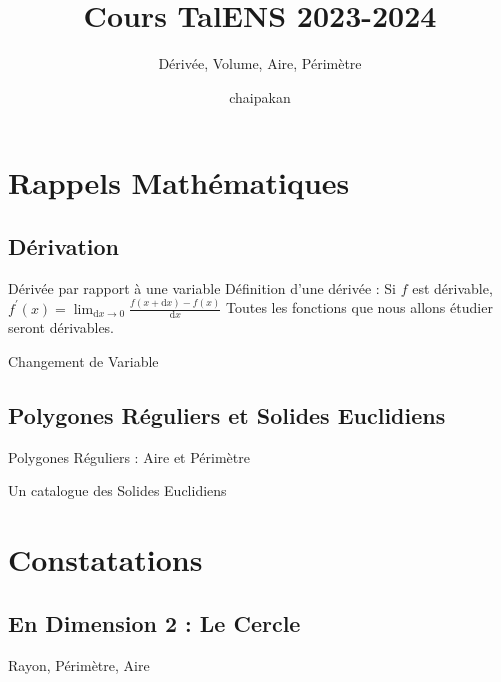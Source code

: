 \documentclass{beamercours}
\title{Cours TalENS 2023-2024}
\subtitle{Dérivée, Volume, Aire, Périmètre}
\date{chaipakan}
\begin{document}
\maketitle

    \section{Rappels Mathématiques}
        \subsection{Dérivation}
            \begin{frame}{Dérivée par rapport à une variable}
                Définition d'une dérivée : Si $f$ est dérivable, $f^{'}(x) = \lim_{\mathrm{d}x \rightarrow 0} \frac{f(x + \mathrm{d}x) - f(x)}{\mathrm{d}x}$
                Toutes les fonctions que nous allons étudier seront dérivables.
            \end{frame}

            
            \begin{frame}{Changement de Variable}   
                
            \end{frame}

        \subsection{Polygones Réguliers et Solides Euclidiens}
            \begin{frame}{Polygones Réguliers : Aire et Périmètre}
                
            \end{frame}
            \begin{frame}{Un catalogue des Solides Euclidiens}
                
            \end{frame}

    \section{Constatations}
        \subsection{En Dimension 2 : Le Cercle}
            \begin{frame}{Rayon, Périmètre, Aire}

            \end{frame}
\end{document}
